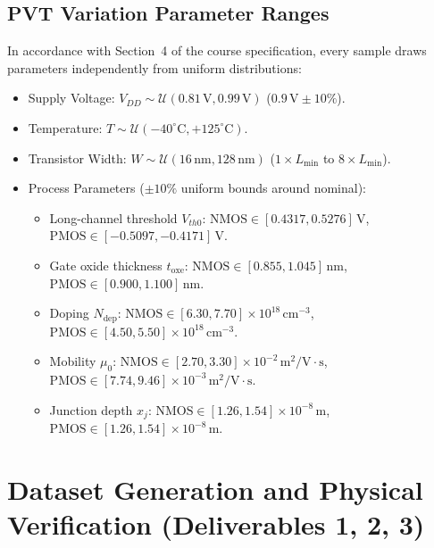 \documentclass[11pt,a4paper]{article}
\begin{document}
\subsection{PVT Variation Parameter Ranges}
In accordance with Section~4 of the course specification, every sample draws parameters independently from uniform distributions:
\begin{itemize}
    \item Supply Voltage: $V_{DD} \sim \mathcal{U}(0.81\,\text{V}, 0.99\,\text{V})$ ($0.9\,\text{V} \pm 10\%$).
    \item Temperature: $T \sim \mathcal{U}(-40^\circ\text{C}, +125^\circ\text{C})$.
    \item Transistor Width: $W \sim \mathcal{U}(16\,\text{nm}, 128\,\text{nm})$ ($1\times L_{\min}$ to $8\times L_{\min}$).
    \item Process Parameters ($\pm 10\%$ uniform bounds around nominal):
    \begin{itemize}
        \item Long-channel threshold $V_{th0}$: $\text{NMOS} \in [0.4317, 0.5276]\,\text{V}$, \\
        $\text{PMOS} \in [-0.5097, -0.4171]\,\text{V}$.
        \item Gate oxide thickness $t_{\text{oxe}}$: $\text{NMOS} \in [0.855, 1.045]\,\text{nm}$, \\
        $\text{PMOS} \in [0.900, 1.100]\,\text{nm}$.
        \item Doping $N_{\text{dep}}$: $\text{NMOS} \in [6.30, 7.70]\times 10^{18}\,\text{cm}^{-3}$, \\
        $\text{PMOS} \in [4.50, 5.50]\times 10^{18}\,\text{cm}^{-3}$.
        \item Mobility $\mu_0$: $\text{NMOS} \in [2.70, 3.30]\times 10^{-2}\,\text{m}^2/\text{V}\cdot\text{s}$, \\
        $\text{PMOS} \in [7.74, 9.46]\times 10^{-3}\,\text{m}^2/\text{V}\cdot\text{s}$.
        \item Junction depth $x_j$: $\text{NMOS} \in [1.26, 1.54]\times 10^{-8}\,\text{m}$, \\
        $\text{PMOS} \in [1.26, 1.54]\times 10^{-8}\,\text{m}$.
    \end{itemize}
\end{itemize}

\section{Dataset Generation and Physical Verification (Deliverables 1, 2, 3)}
\end{document}

